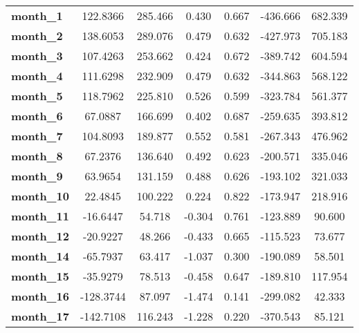\begin{center}
\begin{tabular}{lcccccc}
\textbf{month\_1}     &     122.8366  &      285.466     &     0.430  &         0.667        &     -436.666    &      682.339     \\
\textbf{month\_2}     &     138.6053  &      289.076     &     0.479  &         0.632        &     -427.973    &      705.183     \\
\textbf{month\_3}     &     107.4263  &      253.662     &     0.424  &         0.672        &     -389.742    &      604.594     \\
\textbf{month\_4}     &     111.6298  &      232.909     &     0.479  &         0.632        &     -344.863    &      568.122     \\
\textbf{month\_5}     &     118.7962  &      225.810     &     0.526  &         0.599        &     -323.784    &      561.377     \\
\textbf{month\_6}     &      67.0887  &      166.699     &     0.402  &         0.687        &     -259.635    &      393.812     \\
\textbf{month\_7}     &     104.8093  &      189.877     &     0.552  &         0.581        &     -267.343    &      476.962     \\
\textbf{month\_8}     &      67.2376  &      136.640     &     0.492  &         0.623        &     -200.571    &      335.046     \\
\textbf{month\_9}     &      63.9654  &      131.159     &     0.488  &         0.626        &     -193.102    &      321.033     \\
\textbf{month\_10}    &      22.4845  &      100.222     &     0.224  &         0.822        &     -173.947    &      218.916     \\
\textbf{month\_11}    &     -16.6447  &       54.718     &    -0.304  &         0.761        &     -123.889    &       90.600     \\
\textbf{month\_12}    &     -20.9227  &       48.266     &    -0.433  &         0.665        &     -115.523    &       73.677     \\
\textbf{month\_14}    &     -65.7937  &       63.417     &    -1.037  &         0.300        &     -190.089    &       58.501     \\
\textbf{month\_15}    &     -35.9279  &       78.513     &    -0.458  &         0.647        &     -189.810    &      117.954     \\
\textbf{month\_16}    &    -128.3744  &       87.097     &    -1.474  &         0.141        &     -299.082    &       42.333     \\
\textbf{month\_17}    &    -142.7108  &      116.243     &    -1.228  &         0.220        &     -370.543    &       85.121     \\

\end{tabular}
\end{center}
